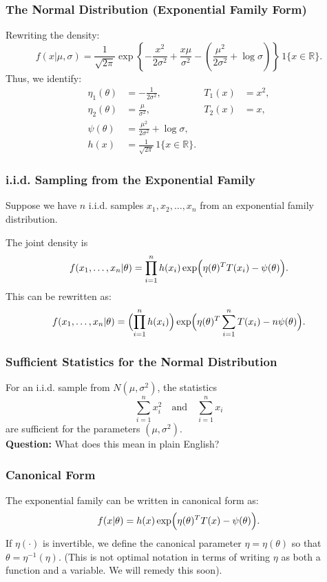 \documentclass{beamer}
\begin{document}
\begin{frame}
\frametitle{The Normal Distribution (Exponential Family Form)}
Rewriting the density:
\[
f(x|\mu,\sigma) = \frac{1}{\sqrt{2\pi}} \exp\!\left\{-\frac{x^2}{2\sigma^2} + \frac{x\mu}{\sigma^2} -\left(\frac{\mu^2}{2\sigma^2} + \log\sigma\right)\right\} \, 1\{x\in\mathbb{R}\}.
\]
Thus, we identify:
\begin{align*}
\eta_1(\theta) &= -\frac{1}{2\sigma^2}, \quad &T_1(x) &= x^2,\\[1mm]
\eta_2(\theta) &= \frac{\mu}{\sigma^2}, \quad &T_2(x) &= x,\\[1mm]
\psi(\theta) &= \frac{\mu^2}{2\sigma^2} + \log\sigma,\\[1mm]
h(x) &= \frac{1}{\sqrt{2\pi}} \, 1\{x\in\mathbb{R}\}.
\end{align*}
\end{frame}

\begin{frame}
\frametitle{i.i.d. Sampling from the Exponential Family}
Suppose we have $n$ i.i.d. samples $x_1,x_2,\dots,x_n$ from an exponential family distribution. 

\vspace*{1em}
The joint density is 
\[
f(x_1,\dots,x_n|\theta) = \prod_{i=1}^n h(x_i)\exp\Bigl(\eta(\theta)^T T(x_i) - \psi(\theta)\Bigr).
\]
This can be rewritten as:
\[
f(x_1,\dots,x_n|\theta) = \Bigl(\prod_{i=1}^n h(x_i)\Bigr)\exp\Bigl(\eta(\theta)^T \sum_{i=1}^n T(x_i) - n\psi(\theta)\Bigr).
\]
\end{frame}

\begin{frame}
\frametitle{Sufficient Statistics for the Normal Distribution}
For an i.i.d. sample from $N(\mu,\sigma^2)$, the statistics
\[
\sum_{i=1}^n x_i^2 \quad \text{and} \quad \sum_{i=1}^n x_i
\]
are sufficient for the parameters $(\mu,\sigma^2)$.\\[1em]
\textbf{Question:} What does this mean in plain English?
\end{frame}

\begin{frame}
\frametitle{Canonical Form}
The exponential family can be written in canonical form as:
\[
f(x|\theta) = h(x)\exp\Bigl(\eta(\theta)^T T(x) - \psi(\theta)\Bigr).
\]
If $\eta(\cdot)$ is invertible, we define the canonical parameter $\eta = \eta(\theta)$ so that $\theta = \eta^{-1}(\eta)$. (This is not optimal notation in terms of writing $\eta$ as both a function and a variable. We will remedy this soon). 

\end{frame}
\end{document}
